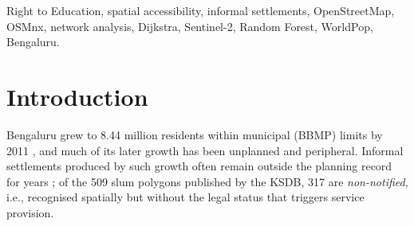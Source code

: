 \documentclass[conference]{IEEEtran}
\newcommand{\km}{\,km}
\begin{document}
\begin{abstract}
India's Right to Education (RTE) rules promise every child a government primary school within a 1\km{} walk, yet compliance is audited with outdated habitation lists and straight-line buffers. We present an open, reproducible pipeline that audits this mandate on the real street network. Sentinel-2 imagery and a Random Forest delineate built-up morphology; an OpenStreetMap pedestrian graph (186,595 nodes) and a single multi-source shortest-path search partition Bengaluru into network catchments of government schools; and WorldPop 2020 population weights the results for all 509 Karnataka Slum Development Board (KSDB) slums. With a curated set of 111 government schools, only 17.3\% of 1,000 sampled locations and 20.1\% of 226,753 slum residents lie within a 1\km{} walk. Straight-line audits overstate compliance: 48.2\% of locations that look compliant by straight line are not compliant on foot. Non-notified slums are significantly worse served than notified ones (population-weighted 2.40 vs.\ 1.71\km{}, $p<10^{-5}$), and ten schools are the nearest government option for 71.5\% of slum residents. The difference between planned and informal areas is small and sensitive to how government schools are identified. Because OpenStreetMap under-records government schools, these figures are best read as lower bounds on access.
\end{abstract}

\begin{IEEEkeywords}
Right to Education, spatial accessibility, informal settlements, OpenStreetMap, OSMnx, network analysis, Dijkstra, Sentinel-2, Random Forest, WorldPop, Bengaluru.
\end{IEEEkeywords}

\section{Introduction}
Bengaluru grew to 8.44 million residents within municipal (BBMP) limits by 2011 \cite{census2011}, and much of its later growth has been unplanned and peripheral. Informal settlements produced by such growth often remain outside the planning record for years \cite{unhabitat2003}; of the 509 slum polygons published by the KSDB, 317 are \emph{non-notified}, i.e., recognised spatially but without the legal status that triggers service provision.
\end{document}
